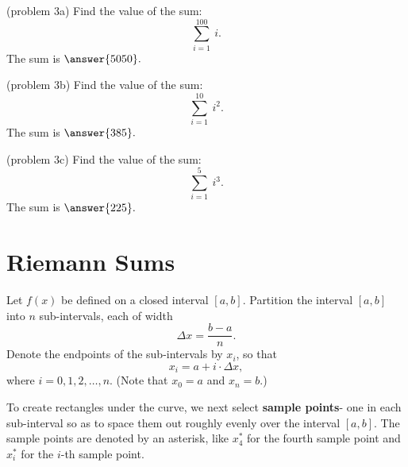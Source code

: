 \documentclass[handout]{ximera}
\begin{document}
\begin{problem}(problem 3a)
Find the value of the sum:
\[\sum_{i = 1}^{100} \ i.\]
The sum is $\answer{5050}.$
\end{problem}

\begin{problem}(problem 3b)
Find the value of the sum:
\[\sum_{i = 1}^{10} \ i^2.\]
The sum is $\answer{385}.$
\end{problem}

\begin{problem}(problem 3c)
Find the value of the sum:
\[\sum_{i = 1}^5 \ i^3.\]
The sum is $\answer{225}.$
\end{problem}

\section{Riemann Sums}


Let $f(x)$ be defined on a closed interval $[a,b]$. Partition the interval 
$[a,b]$ into $n$ sub-intervals, each of width
\[\Delta x = \frac{b-a}{n}.\]
 Denote the endpoints of the sub-intervals by $x_i$, 
so that 
\[x_i =  a + i\cdot \Delta x,\]
 where $i = 0, 1, 2, \ldots, n$. (Note that $x_0 = a$ and $x_n = b$.)  

\begin{image}
\end{image}


To create rectangles under the curve, we next select \textbf{sample points}- one in each sub-interval
so as to space them out roughly evenly over the interval $[a,b]$. The sample points are denoted by an asterisk,
like $x_4^*$ for the fourth sample point and $x_i^*$ for the $i$-th sample point.
\end{document}
